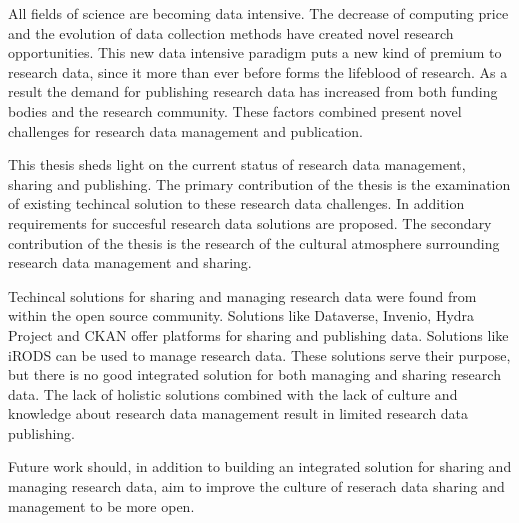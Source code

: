 All fields of science are becoming data intensive. The decrease of computing
price and the evolution of data collection methods have created novel research
opportunities. This new data intensive paradigm
puts a new kind of premium to research data, since it more than ever before
forms the lifeblood of research. As a result the demand for publishing
research data has increased from both funding bodies and the research
community. These factors combined present novel challenges for research data
management and publication.

This thesis sheds light on the current status of research data management,
sharing and publishing. The primary contribution of the thesis is the
examination of existing techincal solution to these research data challenges.
In addition requirements for succesful research data solutions are proposed.
The secondary contribution of the thesis is the research of the cultural
atmosphere surrounding research data management and sharing.

Techincal solutions for sharing and managing research data were found from
within the open source community. Solutions like Dataverse, Invenio, Hydra
Project and CKAN offer platforms for sharing and publishing data. Solutions
like iRODS can be used to manage research data. These solutions serve
their purpose, but there is no good integrated solution for both managing and
sharing research data. The lack of holistic solutions combined with the lack of
culture and knowledge about research data management result in limited research
data publishing.

Future work should, in addition to
building an integrated solution for sharing and managing research data, aim to
improve the culture of reserach data sharing and management to be more open.


